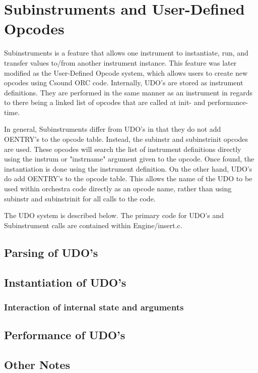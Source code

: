 \documentclass[]{book}
\begin{document}
\section{Subinstruments and User-Defined Opcodes}

Subinstruments is a feature that allows one instrument to instantiate, run, and transfer values to/from another instrument instance. This feature was later modified as the User-Defined Opcode system, which allows users to create new opcodes using Csound ORC code. Internally, UDO's are stored as instrument definitions. They are performed in the same manner as an instrument in regards to there being a linked list of opcodes that are called at init- and performance-time.  

In general, Subinstruments differ from UDO's in that they do not add OENTRY's to the opcode table.  Instead, the subinstr and subinstrinit opcodes are used.  These opcodes will search the list of instrument definitions directly using the instrum or "instrname" argument given to the opcode. Once found, the instantiation is done using the instrument definition.  On the other hand, UDO's do add OENTRY's to the opcode table. This allows the name of the UDO to be used within orchestra code directly as an opcode name, rather than using subinstr and subinstrinit for all calls to the code.

The UDO system is described below. The primary code for UDO's and Subinstrument calls are contained within Engine/insert.c.

\subsection{Parsing of UDO's}

\subsection{Instantiation of UDO's}

\subsubsection{Interaction of internal state and arguments}

\subsection{Performance of UDO's}

\subsection{Other Notes}
\end{document}
